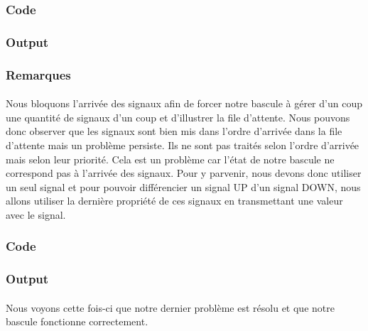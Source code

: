 \documentclass{article}
\begin{document}
\subsubsection*{Code}



\subsubsection*{Output}



\subsubsection*{Remarques}

\paragraph{} Nous bloquons l'arrivée des signaux afin de forcer notre bascule à gérer d'un coup une quantité de signaux d'un coup et d'illustrer la file d'attente. Nous pouvons
donc observer que les signaux sont bien mis dans l'ordre d'arrivée dans la file d'attente mais un problème persiste. Ils ne sont pas traités selon l'ordre d'arrivée mais selon
leur priorité. Cela est un problème car l'état de notre bascule ne correspond pas à l'arrivée des signaux. Pour y parvenir, nous devons donc utiliser un seul signal et pour pouvoir 
différencier un signal UP d'un signal DOWN, nous allons utiliser la dernière propriété de ces signaux en transmettant une valeur avec le signal.

\subsubsection*{Code}



\subsubsection*{Output}



\paragraph{} Nous voyons cette fois-ci que notre dernier problème est résolu et que notre bascule fonctionne correctement.
\end{document}
